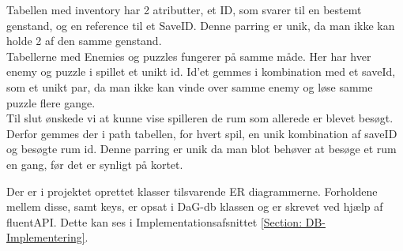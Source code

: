 Tabellen med inventory har 2 atributter, et ID, som svarer til en bestemt genstand, og en reference til et SaveID. Denne parring er unik, da man ikke kan holde 2 af den samme genstand.\\
Tabellerne med Enemies og puzzles fungerer på samme måde. Her har hver enemy og puzzle i spillet et unikt id. Id’et gemmes i kombination med et saveId, som et unikt par, da man ikke kan vinde over samme enemy og løse samme puzzle flere gange.\\
Til slut ønskede vi at kunne vise spilleren de rum som allerede er blevet besøgt. Derfor gemmes der i path tabellen, for hvert spil, en unik kombination af saveID og besøgte rum id. Denne parring er unik da man blot behøver at besøge et rum en gang, før det er synligt på kortet. 

Der er i projektet oprettet klasser tilsvarende ER diagrammerne.
Forholdene mellem disse, samt keys, er opsat i DaG-db klassen og er skrevet ved hjælp af fluentAPI. Dette kan ses i Implementationsafsnittet \autoref{Section: DB-Implementering}.